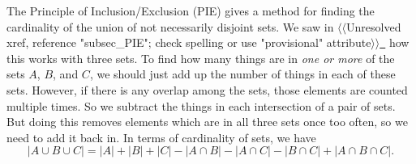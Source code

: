 \documentclass[10pt,]{book}
\theoremstyle{plain}
\theoremstyle{definition}
\theoremstyle{definition}
\theoremstyle{definition}
\numberwithin{equation}{chapter}
\begin{document}
\par
\hypertarget{p-1071}{}%
The Principle of Inclusion/Exclusion (PIE) gives a method for finding the cardinality of the union of not necessarily disjoint sets. We saw in {$\langle\langle$Unresolved xref, reference "subsec\_PIE"; check spelling or use "provisional" attribute$\rangle\rangle$}\hyperlink{}{~} how this works with three sets. To find how many things are in \emph{one or more} of the sets \(A\), \(B\), and \(C\), we should just add up the number of things in each of these sets. However, if there is any overlap among the sets, those elements are counted multiple times. So we subtract the things in each intersection of a pair of sets. But doing this removes elements which are in all three sets once too often, so we need to add it back in. In terms of cardinality of sets, we have%
\begin{equation*}
|A \cup B \cup C| = |A| + |B| + |C| - |A \cap B| - |A \cap C| - |B \cap C| + |A\cap B \cap C|.
\end{equation*}
%
\end{document}
